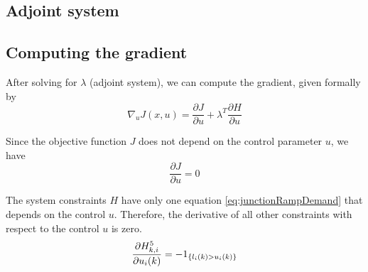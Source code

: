 \subsection{Adjoint system}




\subsection{Computing the gradient}
\label{sec:gradient}
After solving for $\lambda$ (adjoint system), we can compute the gradient, given formally by
\[
\nabla_u J (x, u)
= \frac{\partial J}{\partial u} + \lambda^T \frac{\partial H}{\partial u}
\]

Since the objective function $J$ does not depend on the control parameter $u$, we have
\begin{equation*}
\frac{\partial J}{\partial u} = 0
\end{equation*}

The system constraints $H$ have only one equation \ref{eq:junctionRampDemand} that depends on the control $u$. Therefore, the derivative of all other constraints with respect to the control $u$ is zero.
\begin{equation}
\frac{\partial H^{5}_{k, i} }{\partial u_i(k)} = -1_{\left\{l_i(k) > u_i(k)\right\}}
\end{equation}

